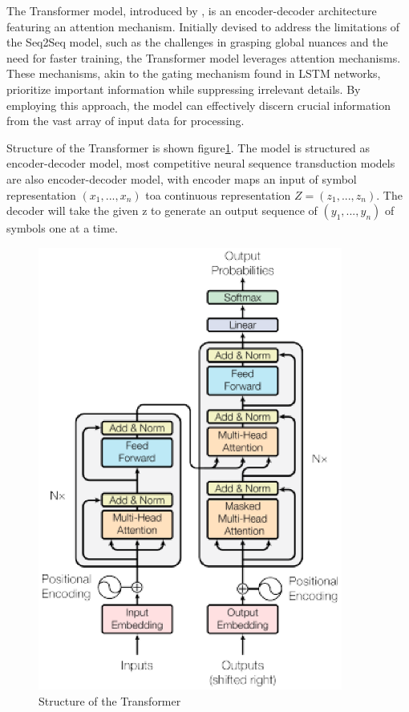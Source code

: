 The Transformer model, introduced by \cite{vaswani2023attention}, is an encoder-decoder architecture featuring an attention mechanism. Initially devised to address the limitations of the Seq2Seq model, such as the challenges in grasping global nuances and the need for faster training, the Transformer model leverages attention mechanisms. These mechanisms, akin to the gating mechanism found in LSTM networks, prioritize important information while suppressing irrelevant details. By employing this approach, the model can effectively discern crucial information from the vast array of input data for processing.

Structure of the Transformer is shown figure\ref{fig:transformer}. The model is structured as encoder-decoder model, most competitive neural sequence transduction models are also encoder-decoder model, with encoder maps an input of symbol representation $(x_1, ...,x_n)$ toa continuous representation $Z=(z_1,...,z_n)$. The decoder will take the given z to generate an output sequence of $(y_1,...,y_n)$ of symbols one at a time.

\begin{figure}[htbp]
    \begin{center}
        \includegraphics[width=10cm]{img/transformer.eps}
        \caption{Structure of the Transformer}\label{fig:transformer}
    \end{center}
\end{figure}

